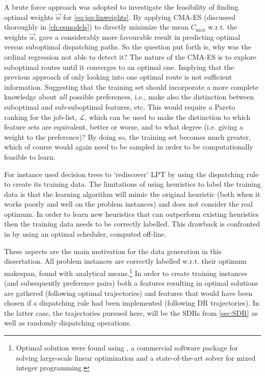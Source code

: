 A brute force approach was adopted to investigate the feasibility of finding optimal weights $\vec{w}$ for \cref{eq:jsp:linweights}. 
By applying CMA-ES (discussed thoroughly in \cref{ch:esmodels}) to directly minimize the mean $C_{\max}$  w.r.t. the weights $\vec{w}$, gave a considerably more favourable result in predicting optimal versus suboptimal dispatching paths. 
So the question put forth is, why was the ordinal regression not able to detect it?
The nature of the CMA-ES is to explore suboptimal routes until it converges to an optimal one. 
Implying that the previous approach of only looking into one optimal route is not sufficient information. 
Suggesting that the training set should incorporate a more complete knowledge about \emph{all} possible preferences, i.e., make also the distinction between suboptimal and sub-suboptimal features, etc.  
This would require a Pareto ranking for the job-list, $\mathcal{L}$, which can 
be used to make the distinction to which feature sets are equivalent, better or 
worse, and to what degree (i.e. giving a weight to the preference)? 
By doing so, the training set becomes much greater, which of course would again need to be sampled in order to be computationally feasible to learn. 

For instance \cite{Siggi05} used decision trees to `rediscover' LPT by using the dispatching rule to create its training data. The limitations of using heuristics to label the training data is that the learning algorithm will mimic the original heuristic (both when it works poorly and well on the problem instances) and does not consider the real optimum. In order to learn new heuristics that can outperform existing heuristics then the training data needs to be correctly labelled. This drawback is confronted in \citep{Malik08,Russell09,Siggi10} by using an optimal scheduler, computed off-line. 

These aspects are the main motivation for the data generation in this dissertation. 
All problem instances are correctly labelled w.r.t. their optimum makespan, found with analytical means.\footnote{Optimal solution were found using \cite{gurobi}, a commercial software package for solving large-scale linear optimization and a state-of-the-art solver for mixed integer programming.} 
In order to create training instances (and subsequently preference pairs) both a features resulting in optimal solutions are gathered (following optimal trajectories) and features that would have been chosen if a dispatching rule had been implemented (following DR trajectories). 
In the latter case, the trajectories pursued here, will be the SDRs from \cref{sec:SDR} as well as randomly dispatching operations.

